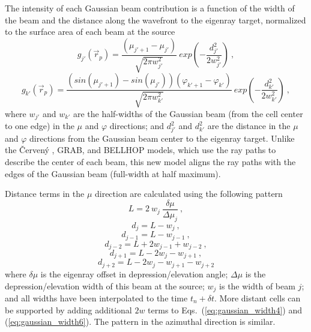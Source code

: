 \documentclass{ws-jca}
\newcommand{\Cerveny}{\v{C}erven\'{y} }
\begin{document}
The intensity of each Gaussian beam contribution is a function of the width
of the beam and the distance along the wavefront to the eigenray target,
normalized to the surface area of each beam at the source
\begin{equation}
	g_{j'}(\vec{r}_p) = \frac{ \left( \mu_{j'+1} - \mu_{j'} \right) }
		{\sqrt{2\pi w^2_{j'}}} 
		\: exp \left( - \frac{d^2_{j'}}{2w^2_{j'}} \right) \:,
	\label{eq:gaussian_each1}
\end{equation}
\begin{equation}
	g_{k'}(\vec{r}_p) = \frac{ \left( sin(\mu_{j'+1}) - sin(\mu_{j'}) \right) 
		\left( \varphi_{k'+1} - \varphi_{k'} \right) }
		{\sqrt{2\pi w^2_{k'}}} 
		\: exp \left( - \frac{d^2_{k'}}{2w^2_{k'}} \right) \:,
	\label{eq:gaussian_each2}
\end{equation}
where
\(w_{j'}\) and \(w_{k'}\) are the half-widths of the Gaussian beam (from the cell
center to one edge) in the \(\mu\) and \(\varphi\) directions; and
\(d^2_{j'}\) and \(d^2_{k'}\) are the distance in the \(\mu\) and \(\varphi\)
directions from the Gaussian beam center to the eigenray target. Unlike the \Cerveny, GRAB, and BELLHOP models, which use the ray paths to describe the center of each beam, this new model aligns the ray paths with the edges of the Gaussian beam 
(full-width at half maximum).

Distance terms in the \(\mu\) direction are calculated using the following pattern
\begin{equation}
	L = 2 \: w_j \: \frac{\delta \mu}{\Delta \mu_j} \:,
	\label{eq:gaussian_width1}
\end{equation}
\begin{equation}
	d_j = L - w_j \:,
	\label{eq:gaussian_width2}
\end{equation}
\begin{equation}
	d_{j-1} = L - w_{j-1} \:,
	\label{eq:gaussian_width3}
\end{equation}
\begin{equation}
	d_{j-2} = L + 2 w_{j-1} + w_{j-2} \:,
	\label{eq:gaussian_width4}
\end{equation}
\begin{equation}
	d_{j+1} = L - 2 w_j - w_{j+1} \:,
	\label{eq:gaussian_width5}
\end{equation}
\begin{equation}
	d_{j+2} = L - 2 w_j - w_{j+1} - w_{j+2}
	\label{eq:gaussian_width6}
\end{equation}
where
\(\delta \mu\) is the eigenray offset in depression/elevation angle;
\(\Delta \mu\) is the depression/elevation width of this beam at the source;
\(w_j\) is the width of beam $j$;
and all widths have been interpolated to the time \(t_n+\delta t\).
More distant cells can be supported by adding additional $2w$ terms to
Eqs.~(\ref{eq:gaussian_width4}) and (\ref{eq:gaussian_width6}). The pattern
in the azimuthal direction is similar.
\end{document}
